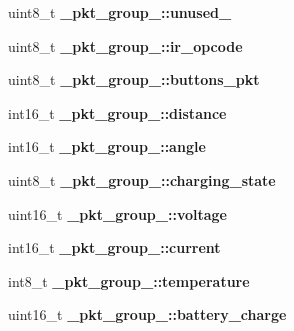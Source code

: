 \begin{DoxyCompactItemize}
\item 
\hypertarget{group__roomba-lib_ga69a34f6ab1d6d514ec3a9be75150278d}{}uint8\+\_\+t {\bfseries \+\_\+pkt\+\_\+group\+\_\+::unused\+\_}\label{group__roomba-lib_ga69a34f6ab1d6d514ec3a9be75150278d}

\item 
\hypertarget{group__roomba-lib_ga6a3f9ac86b16c68e8f67d63bdbaec1bd}{}uint8\+\_\+t {\bfseries \+\_\+pkt\+\_\+group\+\_\+::ir\+\_\+opcode}\label{group__roomba-lib_ga6a3f9ac86b16c68e8f67d63bdbaec1bd}

\item 
\hypertarget{group__roomba-lib_ga996ac1e63fff310ee54ec79eb8e4ecb1}{}uint8\+\_\+t {\bfseries \+\_\+pkt\+\_\+group\+\_\+::buttons\+\_\+pkt}\label{group__roomba-lib_ga996ac1e63fff310ee54ec79eb8e4ecb1}

\item 
\hypertarget{group__roomba-lib_gaa2bff2ee56fe385006823136dd2672a3}{}int16\+\_\+t {\bfseries \+\_\+pkt\+\_\+group\+\_\+::distance}\label{group__roomba-lib_gaa2bff2ee56fe385006823136dd2672a3}

\item 
\hypertarget{group__roomba-lib_gaf57d0be48fa37518915a9562c47f6e84}{}int16\+\_\+t {\bfseries \+\_\+pkt\+\_\+group\+\_\+::angle}\label{group__roomba-lib_gaf57d0be48fa37518915a9562c47f6e84}

\item 
\hypertarget{group__roomba-lib_ga2181d59118d7d5bfdbfc4f5e08d3144a}{}uint8\+\_\+t {\bfseries \+\_\+pkt\+\_\+group\+\_\+::charging\+\_\+state}\label{group__roomba-lib_ga2181d59118d7d5bfdbfc4f5e08d3144a}

\item 
\hypertarget{group__roomba-lib_ga1293d45b10688bdf401cd74eaae7f67c}{}uint16\+\_\+t {\bfseries \+\_\+pkt\+\_\+group\+\_\+::voltage}\label{group__roomba-lib_ga1293d45b10688bdf401cd74eaae7f67c}

\item 
\hypertarget{group__roomba-lib_gaa0437984d7359eb2c3d87d9ef35603d6}{}int16\+\_\+t {\bfseries \+\_\+pkt\+\_\+group\+\_\+::current}\label{group__roomba-lib_gaa0437984d7359eb2c3d87d9ef35603d6}

\item 
\hypertarget{group__roomba-lib_ga0d32d1c274dc57366de4a5dac48b029f}{}int8\+\_\+t {\bfseries \+\_\+pkt\+\_\+group\+\_\+::temperature}\label{group__roomba-lib_ga0d32d1c274dc57366de4a5dac48b029f}

\item 
\hypertarget{group__roomba-lib_ga79ddf92956718508204e32251184bdc6}{}uint16\+\_\+t {\bfseries \+\_\+pkt\+\_\+group\+\_\+::battery\+\_\+charge}\label{group__roomba-lib_ga79ddf92956718508204e32251184bdc6}


\end{DoxyCompactItemize}
